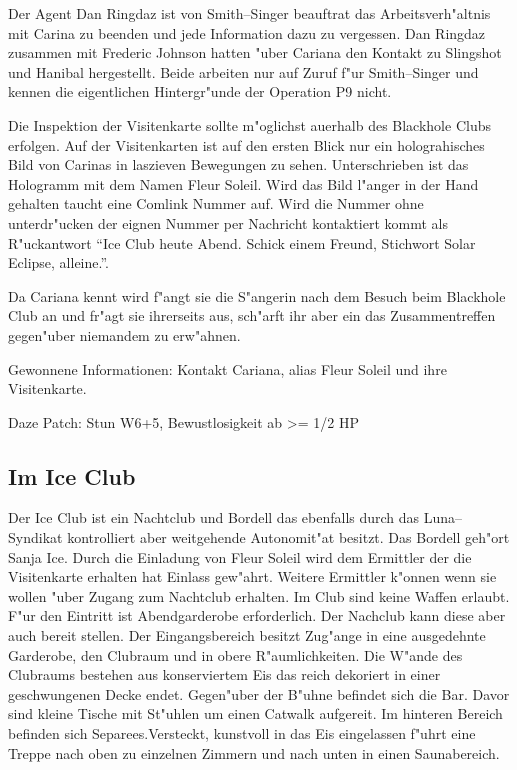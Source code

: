Der Agent {\emph{}Dan Ringdaz} ist von Smith--Singer beauftrat das Arbeitsverh"altnis mit Carina zu beenden und jede Information dazu zu vergessen. Dan Ringdaz zusammen mit Frederic Johnson hatten "uber Cariana den Kontakt zu Slingshot und Hanibal hergestellt. Beide arbeiten nur auf Zuruf f"ur Smith--Singer und kennen die eigentlichen Hintergr"unde der Operation P9 nicht.

Die Inspektion der Visitenkarte sollte m"oglichst au\3erhalb des Blackhole Clubs erfolgen. Auf der Visitenkarten ist auf den ersten Blick nur ein holograhisches Bild von Carinas in laszieven Bewegungen zu sehen. Unterschrieben ist das Hologramm mit dem Namen Fleur Soleil. Wird das Bild l"anger in der Hand gehalten taucht eine Comlink Nummer auf. Wird die Nummer ohne unterdr"ucken der eignen Nummer per Nachricht kontaktiert kommt als R"uckantwort "`Ice Club heute Abend. Schick einem Freund, Stichwort Solar Eclipse, alleine."'.

Da \xl{} Cariana kennt wird f"angt sie die S"angerin nach dem Besuch beim Blackhole Club an und fr"agt sie ihrerseits aus, sch"arft ihr aber ein das Zusammentreffen gegen"uber niemandem zu erw"ahnen.

\begin{remarks}
	Gewonnene Informationen: Kontakt Cariana, alias Fleur Soleil und ihre Visitenkarte.

	Daze Patch: Stun W6+5, Bewustlosigkeit ab >= 1/2 HP
\end{remarks}

\subsection{Im Ice Club}

Der Ice Club ist ein Nachtclub und Bordell das ebenfalls durch das Luna--Syndikat kontrolliert aber weitgehende Autonomit"at besitzt. Das Bordell geh"ort Sanja Ice. Durch die Einladung von Fleur Soleil wird dem Ermittler der die Visitenkarte erhalten hat Einlass gew"ahrt. Weitere Ermittler k"onnen wenn sie wollen "uber \xl{} Zugang zum Nachtclub erhalten. Im Club sind keine Waffen erlaubt. F"ur den Eintritt ist Abendgarderobe erforderlich. Der Nachclub kann diese aber auch bereit stellen. Der Eingangsbereich besitzt Zug"ange in eine ausgedehnte Garderobe, den Clubraum und in obere R"aumlichkeiten. Die W"ande des Clubraums bestehen aus konserviertem Eis das reich dekoriert in einer geschwungenen Decke endet. Gegen"uber der B"uhne befindet sich die Bar. Davor sind kleine Tische mit St"uhlen um einen Catwalk aufgereit. Im hinteren Bereich befinden sich Separees.Versteckt, kunstvoll in das Eis eingelassen f"uhrt eine Treppe nach oben zu einzelnen Zimmern und nach unten in einen Saunabereich.

